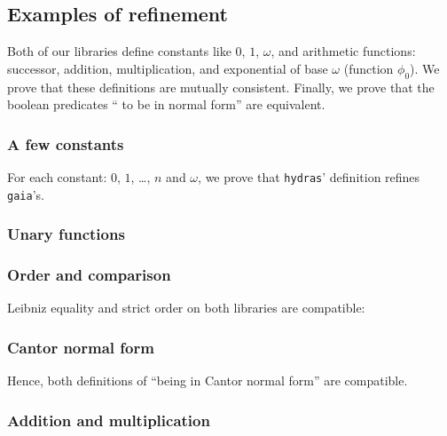 
\subsection{Examples of refinement}
Both of our libraries define constants like $0$, $1$, $\omega$, and arithmetic functions: successor, addition, multiplication, and exponential of base $\omega$ (function $\phi_0$). We prove that these definitions are mutually consistent. Finally, we prove that the boolean predicates `` to be in normal form'' are equivalent.

\subsubsection{A few constants}
For each constant: $0$, $1$, \dots, $n$ and $\omega$, we prove
that \texttt{hydras}' definition refines \texttt{gaia}'s.


\subsubsection{Unary functions}


\subsubsection{Order and comparison}
Leibniz equality and strict order on both libraries are
compatible:



\label{sect:gaia-compare-ref}



\subsubsection{Cantor normal form}

Hence, both definitions of ``being in Cantor normal form'' are
compatible.



\subsubsection{Addition and multiplication}

